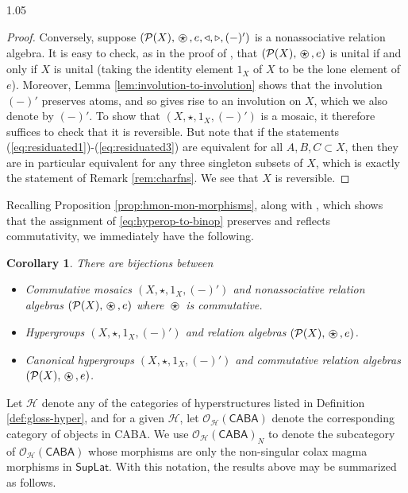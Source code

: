 \documentclass[reqno]{amsart}
\newcommand{\ostar}{%
  \mathbin{%
    \tikz[baseline=(s.base)]{
      \node (s) at (0,0) {$\star$};
      \draw[line width=0.4pt] (s.center) circle[radius=0.82ex];
    }%
  }%
}
\newcommand{\pow}{\mathcal{P}}
\newcommand{\cat}{\mathsf}
\numberwithin{equation}{section}
\theoremstyle{plain}
\newtheorem{corollary}[equation]{Corollary}
\theoremstyle{definition}
\begin{document}
\begin{spacing}{1.05}
\begin{proof}
        Conversely, suppose $(\pow(X),\ostar,e,\triangleleft,\triangleright, (-)')$ is a nonassociative relation algebra. It is easy to check, as in the proof of \cite[N.11]{Dudzik_2016}, that $(\pow(X), \ostar, e)$ is unital if and only if $X$ is unital (taking the identity element $1_X$ of $X$ to be the lone element of $e$). Moreover, Lemma \ref{lem:involution-to-involution} shows that the involution $(-)'$ preserves atoms, and so gives rise to an involution on $X$, which we also denote by $(-)'$. To show that $(X,\star,1_X,(-)')$ is a mosaic, it therefore suffices to check that it is reversible. But note that if the statements (\ref{eq:residuated1})-(\ref{eq:residuated3}) are equivalent for all $A,B,C \subset X$, then they are in particular equivalent for any three singleton subsets of $X$, which is exactly the statement of Remark \ref{rem:charfns}. We see that $X$ is reversible.
\end{proof}

Recalling Proposition \ref{prop:hmon-mon-morphisms}, along with \cite[N.16]{Dudzik_2016}, which shows that the assignment of \ref{eq:hyperop-to-binop} preserves and reflects commutativity, we immediately have the following.

\begin{corollary} \label{cor:commutative-and-hypergroup} There are bijections between
\begin{itemize}
    \item[i.] Commutative mosaics $(X,\star,1_X,(-)')$ and nonassociative relation algebras $(\pow(X),\ostar,e)$ where $\ostar$ is commutative.

    \item[ii.] Hypergroups $(X,\star,1_X,(-)')$ and relation algebras $(\pow(X),\ostar,e)$.

    \item[iii.] Canonical hypergroups $(X,\star,1_X,(-)')$ and commutative relation algebras $(\pow(X),\ostar,e)$.
\end{itemize} 
\end{corollary}

Let $\mathcal{H}$ denote any of the categories of hyperstructures listed in Definition \ref{def:gloss-hyper}, and for a given $\mathcal{H}$, let $\mathcal{O}_\mathcal{H}(\cat{CABA})$ denote the corresponding category of objects in CABA. We use $\mathcal{O}_\mathcal{H}(\cat{CABA})_N$ to denote the subcategory of $\mathcal{O}_\mathcal{H}(\cat{CABA})$ whose morphisms are only the non-singular colax magma morphisms in $\cat{SupLat}$. With this notation, the results above may be summarized as follows.


\end{spacing}
\end{document}
